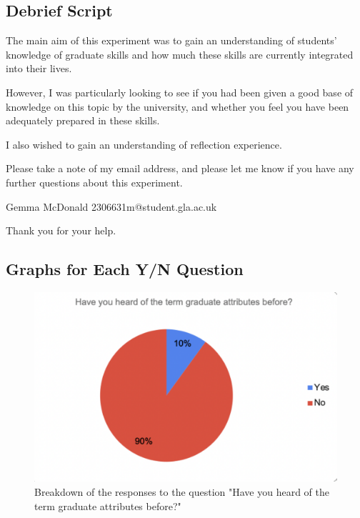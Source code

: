 \documentclass{l4proj}
\begin{document}
\begin{appendices}
\subsection{Debrief Script}
The main aim of this experiment was to gain an understanding of students' knowledge of graduate skills and how much these skills are currently integrated into their lives. 

However, I was particularly looking to see if you had been given a good base of knowledge on this topic by the university, and whether you feel you have been adequately prepared in these skills. 

I also wished to gain an understanding of reflection experience. 

Please take a note of my email address, and please let me know if you have any further questions about this experiment.

Gemma McDonald
2306631m@student.gla.ac.uk

Thank you for your help.


\subsection{Graphs for Each Y/N Question}

\begin{figure}[H]
    \begin{centering}
    \includegraphics[scale=0.5]{images/GradAttr-1.pdf}
    \caption{Breakdown of the responses to the question "Have you heard of the term graduate attributes before?"}
    \label{fig: GradAttr-1}
    \end{centering}
\end{figure}


\end{appendices}
\end{document}
